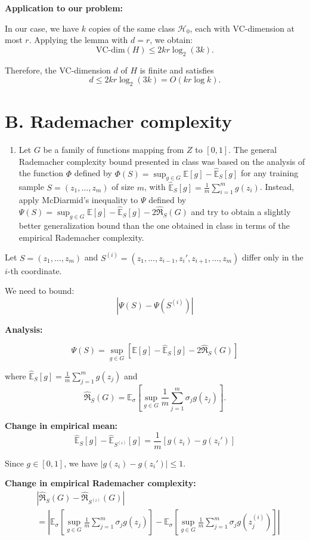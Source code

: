 \documentclass[letterpaper, 11pt]{article}
\newcommand{\1}{\mathds{1}}	%
\theoremstyle{definition}
\begin{document}
\textbf{Application to our problem:}

In our case, we have $k$ copies of the same class $\mathcal{H}_0$, each with VC-dimension at most $r$. Applying the lemma with $d = r$, we obtain:
\[
\text{VC-dim}(H) \leq 2kr \log_2(3k).
\]

Therefore, the VC-dimension $d$ of $H$ is finite and satisfies
\[
d \leq 2kr \log_2(3k) = O(kr \log k).
\]

\section*{B. Rademacher complexity}

\begin{enumerate}
\item Let $G$ be a family of functions mapping from $Z$ to $[0,1]$. The general Rademacher complexity bound presented in class was based on the analysis of the function $\Phi$ defined by $\Phi(S) = \sup_{g \in G} \mathbb{E}[g] - \widehat{\mathbb{E}}_S[g]$ for any training sample $S = (z_1, \ldots, z_m)$ of size $m$, with $\widehat{\mathbb{E}}_S[g] = \frac{1}{m}\sum_{i=1}^m g(z_i)$. Instead, apply McDiarmid's inequality to $\Psi$ defined by $\Psi(S) = \sup_{g \in G} \mathbb{E}[g] - \widehat{\mathbb{E}}_S[g] - 2\widehat{\mathfrak{R}}_S(G)$ and try to obtain a slightly better generalization bound than the one obtained in class in terms of the empirical Rademacher complexity.
\end{enumerate}

Let $S = (z_1, \ldots, z_m)$ and $S^{(i)} = (z_1, \ldots, z_{i-1}, z_i', z_{i+1}, \ldots, z_m)$ differ only in the $i$-th coordinate.

We need to bound:
$$|\Psi(S) - \Psi(S^{(i)})|$$

\textbf{Analysis:}

$$\Psi(S) = \sup_{g \in G} \left[\mathbb{E}[g] - \widehat{\mathbb{E}}_S[g] - 2\widehat{\mathfrak{R}}_S(G)\right]$$

where $\widehat{\mathbb{E}}_S[g] = \frac{1}{m}\sum_{j=1}^m g(z_j)$ and 
$$\widehat{\mathfrak{R}}_S(G) = \mathbb{E}_{\sigma}\left[\sup_{g \in G} \frac{1}{m}\sum_{j=1}^m \sigma_j g(z_j)\right].$$

\textbf{Change in empirical mean:}
$$\widehat{\mathbb{E}}_S[g] - \widehat{\mathbb{E}}_{S^{(i)}}[g] = \frac{1}{m}[g(z_i) - g(z_i')]$$

Since $g \in [0,1]$, we have $|g(z_i) - g(z_i')| \leq 1$.

\textbf{Change in empirical Rademacher complexity:}
\begin{align*}
&\left|\widehat{\mathfrak{R}}_S(G) - \widehat{\mathfrak{R}}_{S^{(i)}}(G)\right| \\
&= \left|\mathbb{E}_{\sigma}\left[\sup_{g \in G} \frac{1}{m}\sum_{j=1}^m \sigma_j g(z_j)\right] - \mathbb{E}_{\sigma}\left[\sup_{g \in G} \frac{1}{m}\sum_{j=1}^m \sigma_j g(z_j^{(i)})\right]\right|
\end{align*}
\end{document}
